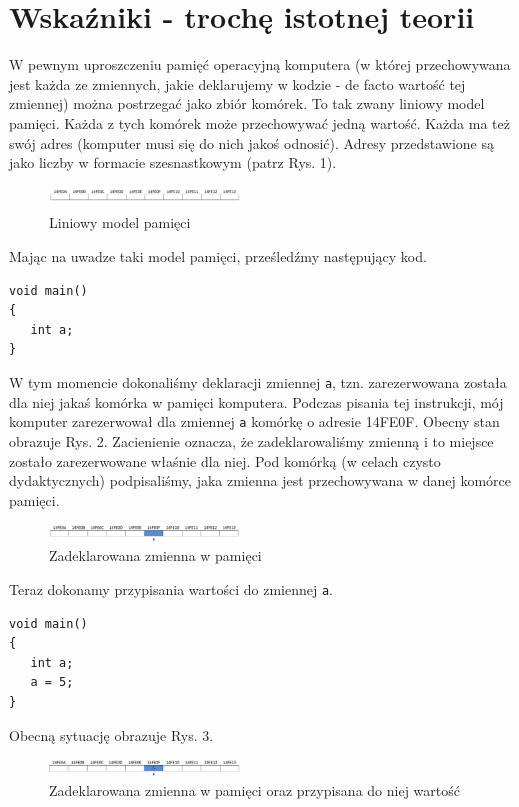 \documentclass{instrukcja}
\begin{document}
\section{Wskaźniki - trochę istotnej teorii}
W pewnym uproszczeniu pamięć operacyjną komputera (w której przechowywana jest każda ze zmiennych, jakie deklarujemy w kodzie - de facto wartość tej zmiennej) można postrzegać jako zbiór komórek. To tak zwany liniowy model pamięci. Każda z tych komórek może przechowywać jedną wartość. Każda ma też swój adres (komputer musi się do nich jakoś odnosić). Adresy przedstawione są jako liczby w formacie szesnastkowym (patrz Rys. 1). 
\begin{figure}[h!]
\centering
\includegraphics[width=0.45\textwidth]{pamiec1.jpg}
\caption{Liniowy model pamięci}
\end{figure}
Mając na uwadze taki model pamięci, prześledźmy następujący kod.
\begin{verbatim}
void main()
{
   int a;
}
\end{verbatim}
W tym momencie dokonaliśmy deklaracji zmiennej {\tt a}, tzn. zarezerwowana została dla niej jakaś komórka w pamięci komputera. Podczas pisania tej instrukcji, mój komputer zarezerwował dla zmiennej {\tt a} komórkę o adresie 14FE0F. Obecny stan obrazuje Rys. 2. Zacienienie oznacza, że zadeklarowaliśmy zmienną i to miejsce zostało zarezerwowane właśnie dla niej. Pod komórką (w celach czysto dydaktycznych) podpisaliśmy, jaka zmienna jest przechowywana w danej komórce pamięci.
\begin{figure}[h!]
\centering
\includegraphics[width=0.45\textwidth]{pamiec2.jpg}
\caption{Zadeklarowana zmienna w pamięci}
\end{figure}

Teraz dokonamy przypisania wartości do zmiennej {\tt a}.
\begin{verbatim}
void main()
{
   int a;
   a = 5;
}
\end{verbatim}
Obecną sytuację obrazuje Rys. 3.
\begin{figure}[h!]
\centering
\includegraphics[width=0.45\textwidth]{pamiec3.jpg}
\caption{Zadeklarowana zmienna w pamięci oraz przypisana do niej wartość}
\end{figure}
\end{document}
